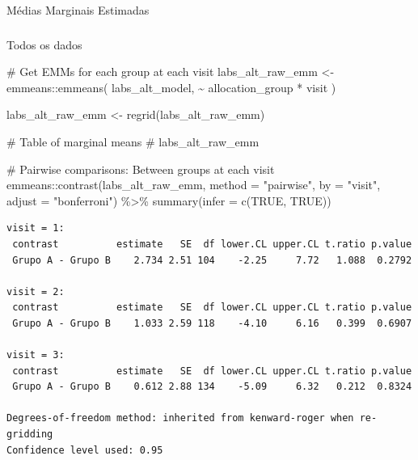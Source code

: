 \documentclass[
  12pt,
]{article}
\makeatletter
\let\oldparagraph\paragraph
\renewcommand{\paragraph}{
    \@ifstar
      \xxxParagraphStar
      \xxxParagraphNoStar
  }
\newcommand{\xxxParagraphStar}[1]{\oldparagraph*{#1}\mbox{}}
\newcommand{\xxxParagraphNoStar}[1]{\oldparagraph{#1}\mbox{}}
\let\oldsubparagraph\subparagraph
\renewcommand{\subparagraph}{
    \@ifstar
      \xxxSubParagraphStar
      \xxxSubParagraphNoStar
  }
\newcommand{\xxxSubParagraphStar}[1]{\oldsubparagraph*{#1}\mbox{}}
\newcommand{\xxxSubParagraphNoStar}[1]{\oldsubparagraph{#1}\mbox{}}
\newenvironment{Shaded}{\begin{snugshade}}{\end{snugshade}}
\newcommand{\AttributeTok}[1]{\textcolor[rgb]{0.40,0.45,0.13}{#1}}
\newcommand{\CommentTok}[1]{\textcolor[rgb]{0.37,0.37,0.37}{#1}}
\newcommand{\ConstantTok}[1]{\textcolor[rgb]{0.56,0.35,0.01}{#1}}
\newcommand{\FunctionTok}[1]{\textcolor[rgb]{0.28,0.35,0.67}{#1}}
\newcommand{\NormalTok}[1]{\textcolor[rgb]{0.00,0.23,0.31}{#1}}
\newcommand{\OtherTok}[1]{\textcolor[rgb]{0.00,0.23,0.31}{#1}}
\newcommand{\SpecialCharTok}[1]{\textcolor[rgb]{0.37,0.37,0.37}{#1}}
\newcommand{\StringTok}[1]{\textcolor[rgb]{0.13,0.47,0.30}{#1}}
\makeatother
\begin{document}
\paragraph{Médias Marginais
Estimadas}\label{muxe9dias-marginais-estimadas-1}

\subparagraph{Todos os dados}\label{todos-os-dados-1}

\begin{Shaded}
\begin{Highlighting}[]
\CommentTok{\# Get EMMs for each group at each visit}
\NormalTok{labs\_alt\_raw\_emm }\OtherTok{\textless{}{-}}\NormalTok{ emmeans}\SpecialCharTok{::}\FunctionTok{emmeans}\NormalTok{(}
\NormalTok{    labs\_alt\_model, }
    \SpecialCharTok{\textasciitilde{}}\NormalTok{ allocation\_group }\SpecialCharTok{*}\NormalTok{ visit}
\NormalTok{)}

\NormalTok{labs\_alt\_raw\_emm }\OtherTok{\textless{}{-}} \FunctionTok{regrid}\NormalTok{(labs\_alt\_raw\_emm)}

\CommentTok{\# Table of marginal means}
\CommentTok{\# labs\_alt\_raw\_emm}

\CommentTok{\# Pairwise comparisons: Between groups at each visit}
\NormalTok{emmeans}\SpecialCharTok{::}\FunctionTok{contrast}\NormalTok{(labs\_alt\_raw\_emm,}
\AttributeTok{method =} \StringTok{"pairwise"}\NormalTok{, }\AttributeTok{by =} \StringTok{"visit"}\NormalTok{,}
\AttributeTok{adjust =} \StringTok{"bonferroni"}\NormalTok{) }\SpecialCharTok{\%\textgreater{}\%} \FunctionTok{summary}\NormalTok{(}\AttributeTok{infer =} \FunctionTok{c}\NormalTok{(}\ConstantTok{TRUE}\NormalTok{, }\ConstantTok{TRUE}\NormalTok{))}
\end{Highlighting}
\end{Shaded}

\begin{verbatim}
visit = 1:
 contrast          estimate   SE  df lower.CL upper.CL t.ratio p.value
 Grupo A - Grupo B    2.734 2.51 104    -2.25     7.72   1.088  0.2792

visit = 2:
 contrast          estimate   SE  df lower.CL upper.CL t.ratio p.value
 Grupo A - Grupo B    1.033 2.59 118    -4.10     6.16   0.399  0.6907

visit = 3:
 contrast          estimate   SE  df lower.CL upper.CL t.ratio p.value
 Grupo A - Grupo B    0.612 2.88 134    -5.09     6.32   0.212  0.8324

Degrees-of-freedom method: inherited from kenward-roger when re-gridding 
Confidence level used: 0.95 
\end{verbatim}
\end{document}
